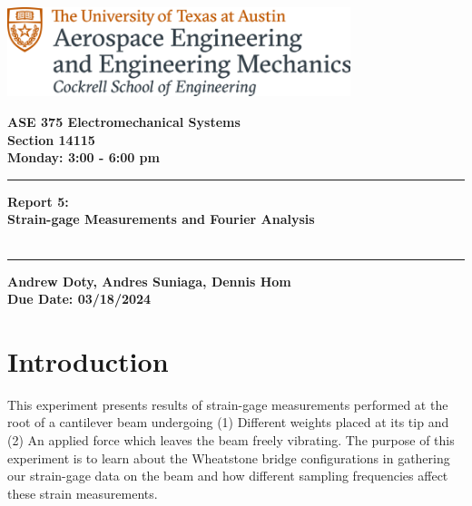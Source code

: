 \documentclass{article}
\begin{document}
\begin{titlepage}
  \centering
  \includegraphics[width=10cm]{ase-logo-formal.png}  %
  \vspace{1cm}  %
 
  \Large \textbf{ASE 375 Electromechanical Systems}\\
  \large \textbf{Section 14115}\\
  \vspace{0.5cm}
  \textbf{Monday: 3:00 - 6:00 pm}\\
 
  \vspace{1cm}
 
  \hrule
  \vspace{0.5cm}
 
  \Huge \textbf{Report 5:\\
  Strain-gage Measurements and Fourier Analysis}\\
  \Huge \textbf{}\\
 
  \vspace{0.5cm}
  \hrule
 
  \vspace{1cm}
 
  \normalsize \textbf{Andrew Doty, Andres Suniaga, Dennis Hom}\\
  \normalsize \textbf{Due Date: 03/18/2024}
 
\end{titlepage}
\newpage

\tableofcontents
\thispagestyle{empty}
\newpage

\section{Introduction}
This experiment presents results of strain-gage measurements performed at the root of a cantilever beam undergoing (1) Different weights placed at its tip and (2) An applied force which leaves the beam freely vibrating. The purpose of this experiment is to learn about the Wheatstone bridge configurations in gathering our strain-gage data on the beam and how different sampling frequencies affect these strain measurements.
\vspace{5mm}
\end{document}

